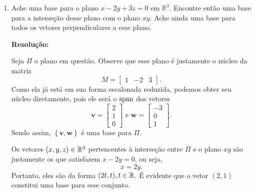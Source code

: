 \documentclass[leqno]{article}
\numberwithin{equation}{section}
\newcommand{\bR}{\mathbb{R}}
\newcommand{\bfw}{\mathbf{w}}
\newcommand{\bfv}{\mathbf{v}}
\newenvironment{sol}
{
    \vspace{4mm}
    \noindent\textbf{Resolução:}
    \strut\newline
    \smallskip
    \hspace{-3.5mm}
}
{}
\begin{document}
\begin{enumerate}
    \item Ache uma base para o plano $x - 2y + 3z = 0$ em $\bR^3$. Encontre então uma base para a interseção desse plano com o plano $xy$. Ache ainda uma base para todos os vetores perpendiculares a esse plano.

        \begin{sol} 
            Seja \( \Pi \) o plano em questão.
            Observe que esse plano é justamente o núcleo da matriz
            \begin{equation*}
                M =
                \begin{bmatrix}
                    1 & -2 & 3
                \end{bmatrix}
            .\end{equation*}
            Como ela já está em sua forma escalonada reduzida, podemos obter seu núcleo diretamente, pois ele será o \( \operatorname{span}  \) dos vetores
            \begin{equation*}
                \bfv =
                \begin{bmatrix}
                    2 \\
                    1 \\
                    0
                \end{bmatrix}
                \text{ e }
                \bfw =
                \begin{bmatrix}
                    -3 \\
                    0 \\
                    1
                \end{bmatrix}
            .\end{equation*}
            Sendo assim, \( \left\{ \bfv, \bfw \right\} \) é uma base para \( \Pi \).

            Os vetores \( ( x, y, z ) \in \mathbb{R}^{ 3 } \) pertencentes à interseção entre \( \Pi \) e o plano \( xy \) são justamente os que satisfazem \( x - 2y = 0 \), ou seja,
            \begin{equation*}
                x = 2y
            .\end{equation*}
            Portanto, eles são da forma \( ( 2t, t ), t \in \mathbb{R} \).
            É evidente que o vetor \( ( 2, 1 ) \) constitui uma base para esse conjunto.


\end{sol}
\end{enumerate}
\end{document}
